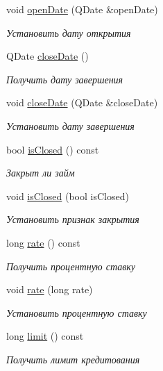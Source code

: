 \begin{DoxyCompactItemize}
void \hyperlink{classkpk_1_1data_1_1_loan_a46351e2f11a23a671e2a2d4be126eb2b}{open\+Date} (Q\+Date \&open\+Date)
\begin{DoxyCompactList}\small\item\em Установить дату открытия \end{DoxyCompactList}\item 
Q\+Date \hyperlink{classkpk_1_1data_1_1_loan_af8ccbb954480eae0aa3b2a6b2f39fcb5}{close\+Date} ()
\begin{DoxyCompactList}\small\item\em Получить дату завершения \end{DoxyCompactList}\item 
void \hyperlink{classkpk_1_1data_1_1_loan_ada266f079bcda1b9877ab161655c22e1}{close\+Date} (Q\+Date \&close\+Date)
\begin{DoxyCompactList}\small\item\em Установить дату завершения \end{DoxyCompactList}\item 
bool \hyperlink{classkpk_1_1data_1_1_loan_a70783859ac8c369fbacf45743b7dc527}{is\+Closed} () const 
\begin{DoxyCompactList}\small\item\em Закрыт ли займ \end{DoxyCompactList}\item 
void \hyperlink{classkpk_1_1data_1_1_loan_a582b7aa81d2087f14f69caf92254e865}{is\+Closed} (bool is\+Closed)
\begin{DoxyCompactList}\small\item\em Установить признак закрытия \end{DoxyCompactList}\item 
long \hyperlink{classkpk_1_1data_1_1_loan_affb2d1a39a5c7c185b07d5f6de87a43e}{rate} () const 
\begin{DoxyCompactList}\small\item\em Получить процентную ставку \end{DoxyCompactList}\item 
void \hyperlink{classkpk_1_1data_1_1_loan_aefef4f72d088471f5f32d1843c221108}{rate} (long rate)
\begin{DoxyCompactList}\small\item\em Установить процентную ставку \end{DoxyCompactList}\item 
long \hyperlink{classkpk_1_1data_1_1_loan_ae82f80aa7a9b58fdfb2ac818dd33611d}{limit} () const 
\begin{DoxyCompactList}\small\item\em Получить лимит кредитования \end{DoxyCompactList}\item 

\end{DoxyCompactItemize}
